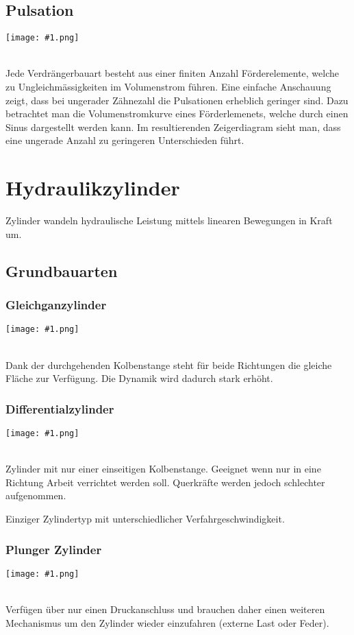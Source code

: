 \documentclass[landscape,a4paper,10pt]{article}
\newcommand{\graphicsm}[1]{
\noindent
\begin{minipage}{\columnwidth}
\centering
\texttt{[image: \#1.png]}
\end{minipage} 
\medskip 
\\
}
\newcommand{\graphiccol}[1]{
\noindent
\begin{minipage}{\columnwidth}
\centering
\texttt{[image: \#1.png]}
\end{minipage}
\medskip \\
}
\begin{document}
\begin{multicols*}{3}
\subsection{Pulsation}
\graphiccol{pulsation}
Jede Verdrängerbauart besteht aus einer finiten Anzahl Förderelemente, welche zu Ungleichmässigkeiten im Volumenstrom führen. Eine einfache Anschauung zeigt, dass bei ungerader Zähnezahl die Pulsationen erheblich geringer sind. Dazu betrachtet man die Volumenstromkurve eines Förderlemenets, welche durch einen Sinus dargestellt werden kann. Im resultierenden Zeigerdiagram sieht man, dass eine ungerade Anzahl zu geringeren Unterschieden führt. 


\vfill
\columnbreak
\section{Hydraulikzylinder}
Zylinder wandeln hydraulische Leistung mittels linearen Bewegungen in Kraft um.  


\subsection{Grundbauarten}
\subsubsection*{Gleichganzylinder}
\graphicsm{zyl_gleichgang}
Dank der durchgehenden Kolbenstange steht für beide Richtungen die gleiche Fläche zur Verfügung. Die Dynamik wird dadurch stark erhöht.


\subsubsection*{Differentialzylinder}
\graphicsm{zyl_differential}
Zylinder mit nur einer einseitigen Kolbenstange. Geeignet wenn nur in eine Richtung Arbeit verrichtet werden soll. Querkräfte werden jedoch schlechter aufgenommen.

Einziger Zylindertyp mit unterschiedlicher Verfahrgeschwindigkeit.


\subsubsection*{Plunger Zylinder}
\graphicsm{zyl_plunger}
Verfügen über nur einen Druckanschluss und brauchen daher einen weiteren Mechanismus um den Zylinder wieder einzufahren (externe Last oder Feder). 




\end{multicols*}
\end{document}
